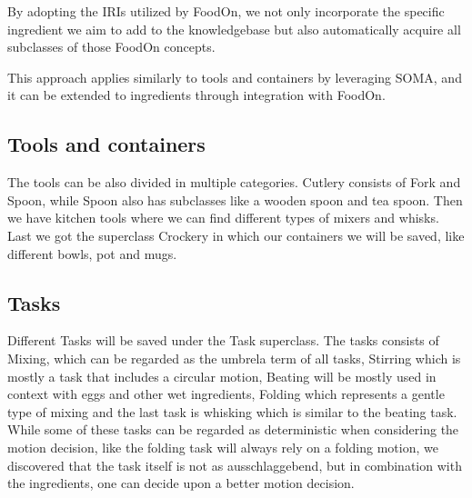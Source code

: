 By adopting the IRIs utilized by FoodOn, we not only incorporate the specific ingredient we aim to add to the knowledgebase but also automatically acquire all subclasses of those FoodOn concepts. 

This approach applies similarly to tools and containers by leveraging SOMA, and it can be extended to ingredients through integration with FoodOn.


\subsection{Tools and containers}
The tools can be also divided in multiple categories. Cutlery consists of Fork and Spoon, while Spoon also has subclasses like a wooden spoon and tea spoon.
Then we have kitchen tools where we can find different types of mixers and whisks. Last we got the superclass Crockery in which our containers we will be saved, like different bowls, pot and mugs.

\subsection{Tasks}
Different Tasks will be saved under the Task superclass. The tasks consists of Mixing, which can be regarded as the umbrela term of all tasks, Stirring which is mostly a task that includes a circular motion, Beating will be mostly used in context with eggs and other wet ingredients, Folding which represents a gentle type of mixing and the last task is whisking which is similar to the beating task.
While some of these tasks can be regarded as deterministic when considering the motion decision, like the folding task will always rely on a folding motion, we discovered that the task itself is not as ausschlaggebend, but in combination with the ingredients, one can decide upon a better motion decision. 

